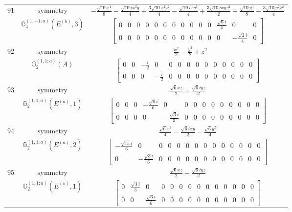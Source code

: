 \documentclass[fleqn,8pt,landscape]{jsarticle}
\begin{document}
\begin{longtable}{ccc}
$ 91 $ & $ \text{symmetry} $ & $ - \frac{\sqrt{10} x^{4}}{8} - \frac{\sqrt{10} i x^{3} y}{4} + \frac{3 \sqrt{10} x^{2} z^{2}}{4} - \frac{\sqrt{10} i x y^{3}}{4} + \frac{3 \sqrt{10} i x y z^{2}}{2} + \frac{\sqrt{10} y^{4}}{8} - \frac{3 \sqrt{10} y^{2} z^{2}}{4} $ \\
$  $ & $ \mathbb{G}_{4}^{(1,-1;a)}(E^{(b)},3) $ & $ \begin{bmatrix} 0 & 0 & 0 & 0 & 0 & 0 & 0 & 0 & 0 & 0 & 0 & \frac{\sqrt{6} i}{4} & 0 & 0 \\ 0 & 0 & 0 & 0 & 0 & 0 & 0 & 0 & 0 & 0 & 0 & 0 & - \frac{\sqrt{2} i}{4} & 0 \end{bmatrix} $ \\ \hline
$ 92 $ & $ \text{symmetry} $ & $ - \frac{x^{2}}{2} - \frac{y^{2}}{2} + z^{2} $ \\
$  $ & $ \mathbb{G}_{2}^{(1,1;a)}(A) $ & $ \begin{bmatrix} 0 & 0 & - \frac{i}{2} & 0 & 0 & 0 & 0 & 0 & 0 & 0 & 0 & 0 & 0 & 0 \\ 0 & 0 & 0 & - \frac{i}{2} & 0 & 0 & 0 & 0 & 0 & 0 & 0 & 0 & 0 & 0 \end{bmatrix} $ \\ \hline
$ 93 $ & $ \text{symmetry} $ & $ \frac{\sqrt{6} x z}{2} + \frac{\sqrt{6} i y z}{2} $ \\
$  $ & $ \mathbb{G}_{2}^{(1,1;a)}(E^{(a)},1) $ & $ \begin{bmatrix} 0 & 0 & 0 & - \frac{\sqrt{6} i}{6} & 0 & 0 & 0 & 0 & 0 & 0 & 0 & 0 & 0 & 0 \\ 0 & 0 & 0 & 0 & - \frac{\sqrt{3} i}{3} & 0 & 0 & 0 & 0 & 0 & 0 & 0 & 0 & 0 \end{bmatrix} $ \\ \hline
$ 94 $ & $ \text{symmetry} $ & $ \frac{\sqrt{6} x^{2}}{4} - \frac{\sqrt{6} i x y}{2} - \frac{\sqrt{6} y^{2}}{4} $ \\
$  $ & $ \mathbb{G}_{2}^{(1,1;a)}(E^{(a)},2) $ & $ \begin{bmatrix} - \frac{\sqrt{15} i}{6} & 0 & 0 & 0 & 0 & 0 & 0 & 0 & 0 & 0 & 0 & 0 & 0 & 0 \\ 0 & - \frac{\sqrt{3} i}{6} & 0 & 0 & 0 & 0 & 0 & 0 & 0 & 0 & 0 & 0 & 0 & 0 \end{bmatrix} $ \\ \hline
$ 95 $ & $ \text{symmetry} $ & $ \frac{\sqrt{6} x z}{2} - \frac{\sqrt{6} i y z}{2} $ \\
$  $ & $ \mathbb{G}_{2}^{(1,1;a)}(E^{(b)},1) $ & $ \begin{bmatrix} 0 & \frac{\sqrt{3} i}{3} & 0 & 0 & 0 & 0 & 0 & 0 & 0 & 0 & 0 & 0 & 0 & 0 \\ 0 & 0 & \frac{\sqrt{6} i}{6} & 0 & 0 & 0 & 0 & 0 & 0 & 0 & 0 & 0 & 0 & 0 \end{bmatrix} $ \\ \hline

\end{longtable}
\end{document}
